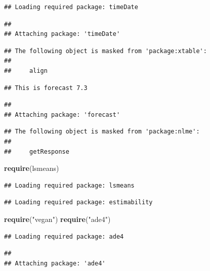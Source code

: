 \documentclass[]{article}
\newenvironment{Shaded}{\begin{snugshade}}{\end{snugshade}}
\newcommand{\KeywordTok}[1]{\textcolor[rgb]{0.13,0.29,0.53}{\textbf{{#1}}}}
\newcommand{\StringTok}[1]{\textcolor[rgb]{0.31,0.60,0.02}{{#1}}}
\newcommand{\NormalTok}[1]{{#1}}
\begin{document}
\begin{verbatim}
## Loading required package: timeDate
\end{verbatim}

\begin{verbatim}
## 
## Attaching package: 'timeDate'
\end{verbatim}

\begin{verbatim}
## The following object is masked from 'package:xtable':
## 
##     align
\end{verbatim}

\begin{verbatim}
## This is forecast 7.3
\end{verbatim}

\begin{verbatim}
## 
## Attaching package: 'forecast'
\end{verbatim}

\begin{verbatim}
## The following object is masked from 'package:nlme':
## 
##     getResponse
\end{verbatim}

\begin{Shaded}
\begin{Highlighting}[]
\KeywordTok{require}\NormalTok{(lsmeans)}
\end{Highlighting}
\end{Shaded}

\begin{verbatim}
## Loading required package: lsmeans
\end{verbatim}

\begin{verbatim}
## Loading required package: estimability
\end{verbatim}

\begin{Shaded}
\begin{Highlighting}[]
\KeywordTok{require}\NormalTok{(}\StringTok{"vegan"}\NormalTok{)}
\KeywordTok{require}\NormalTok{(}\StringTok{"ade4"}\NormalTok{)}
\end{Highlighting}
\end{Shaded}

\begin{verbatim}
## Loading required package: ade4
\end{verbatim}

\begin{verbatim}
## 
## Attaching package: 'ade4'
\end{verbatim}
\end{document}
